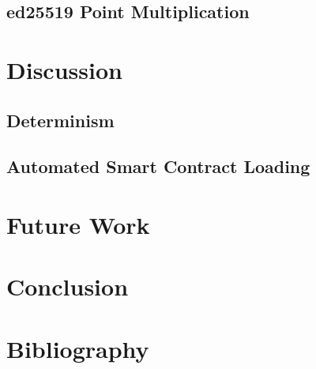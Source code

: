 \documentclass[11pt, a4paper, twoside, openright]{article}
\begin{document}
\subsection{ed25519 Point Multiplication}

\section{Discussion}

\subsection{Determinism}

\subsection{Automated Smart Contract Loading}


\section{Future Work}

\section{Conclusion}
\newpage
\section{Bibliography}


\end{document}
